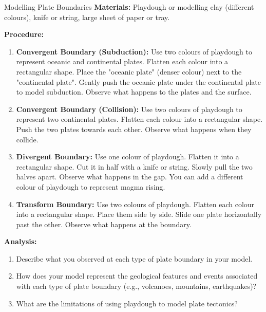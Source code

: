 \begin{investigation}{Modelling Plate Boundaries}
\textbf{Materials:}  Playdough or modelling clay (different colours),  knife or string,  large sheet of paper or tray.

\textbf{Procedure:}
\begin{enumerate}
    \item \textbf{Convergent Boundary (Subduction):}  Use two colours of playdough to represent oceanic and continental plates.  Flatten each colour into a rectangular shape.  Place the "oceanic plate" (denser colour) next to the "continental plate". Gently push the oceanic plate under the continental plate to model subduction. Observe what happens to the plates and the surface.
    \item \textbf{Convergent Boundary (Collision):} Use two colours of playdough to represent two continental plates. Flatten each colour into a rectangular shape.  Push the two plates towards each other. Observe what happens when they collide.
    \item \textbf{Divergent Boundary:}  Use one colour of playdough. Flatten it into a rectangular shape.  Cut it in half with a knife or string.  Slowly pull the two halves apart.  Observe what happens in the gap. You can add a different colour of playdough to represent magma rising.
    \item \textbf{Transform Boundary:} Use two colours of playdough. Flatten each colour into a rectangular shape. Place them side by side.  Slide one plate horizontally past the other.  Observe what happens at the boundary.
\end{enumerate}

\textbf{Analysis:}
\begin{enumerate}
    \item  Describe what you observed at each type of plate boundary in your model.
    \item  How does your model represent the geological features and events associated with each type of plate boundary (e.g., volcanoes, mountains, earthquakes)?
    \item  What are the limitations of using playdough to model plate tectonics?
\end{enumerate}
\end{investigation}


